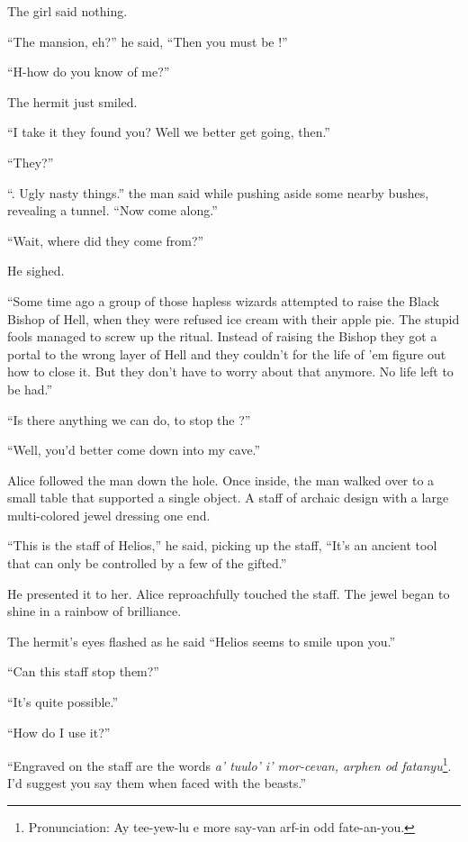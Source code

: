 \noindent
The girl said nothing.
\VV


``The mansion, eh?'' he said, ``Then you must be \april!''


``H-how do you know of me?''
\VV


\noindent
The hermit just smiled.
\VV


``I take it they found you? Well we better get going, then.''


``They?''


``\creaturenames.  Ugly nasty things.'' the man said while pushing
aside some nearby bushes, revealing a tunnel. ``Now come along.''


``Wait, where did they come from?''
\VV


\noindent
He sighed.
\VV


``Some time ago a group of those hapless wizards attempted
to raise the Black Bishop of Hell, when they were refused ice
cream with their apple pie.
The stupid fools managed to screw up the ritual.
Instead of raising the Bishop
they got a portal to the wrong layer of Hell and they couldn't
for the life of 'em figure out how to close it.
But they don't have to worry about that anymore.
No life left to be had.''


``Is there anything we can do, to stop the \creaturenames?''


``Well, you'd better come down into my cave.''
\VV


\noindent
Alice followed the man down the hole.
Once inside, the man walked over to a small table that supported a single object.
A staff of archaic design with a large multi-colored jewel dressing one end.
\VV


``This is the staff of Helios,'' he said, picking up the staff,
``It's an ancient tool that can only be controlled by a few of the gifted.''
\VV


\noindent
He presented it to her.
Alice reproachfully touched the staff.
The jewel began to shine in a rainbow of brilliance.
\VV


The hermit's eyes flashed as he said ``Helios seems to smile upon you.''


``Can this staff stop them?''


``It's quite possible.''


``How do I use it?''


``Engraved on the staff are the words
\textit{a' tuulo' i' mor-cevan, arphen od fatanyu}\footnote{
Pronunciation:
Ay tee-yew-lu e more say-van arf-in odd fate-an-you.
}.
I'd suggest you say them when faced with the beasts.''
\VV


